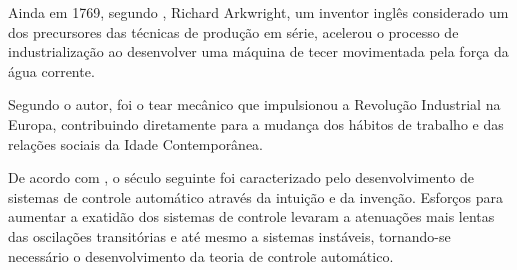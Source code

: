 Ainda em 1769, segundo , Richard Arkwright, um inventor
inglês considerado um dos precursores das técnicas de produção em série,
acelerou o processo de industrialização ao desenvolver uma máquina de tecer
movimentada pela força da água corrente. 

Segundo o autor, foi o tear mecânico que impulsionou a Revolução Industrial na
Europa, contribuindo diretamente para a mudança dos hábitos de trabalho e das
relações sociais da Idade Contemporânea. 

De acordo com , o século seguinte foi caracterizado pelo
desenvolvimento de sistemas de controle automático através da intuição e da
invenção. Esforços para aumentar a exatidão dos sistemas de controle levaram a
atenuações mais lentas das oscilações transitórias e até mesmo a sistemas
instáveis, tornando-se necessário o desenvolvimento da teoria de controle
automático.

